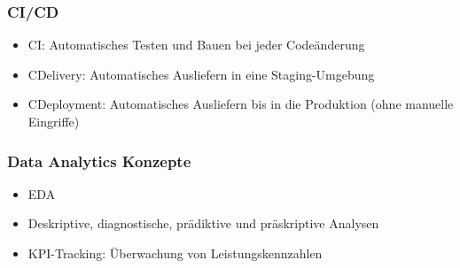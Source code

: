 \documentclass[11pt]{scrartcl}
\begin{document}
\subsubsection*{CI/CD}
\begin{itemize}
	\item CI: Automatisches Testen und Bauen bei jeder Codeänderung
	\item CDelivery: Automatisches Ausliefern in eine Staging-Umgebung
	\item CDeployment: Automatisches Ausliefern bis in die Produktion (ohne manuelle Eingriffe)	
\end{itemize}

\subsubsection*{Data Analytics Konzepte}
\begin{itemize}
	\item EDA
	\item Deskriptive, diagnostische, prädiktive und präskriptive Analysen
	\item KPI-Tracking: Überwachung von Leistungskennzahlen
\end{itemize}
\end{document}
